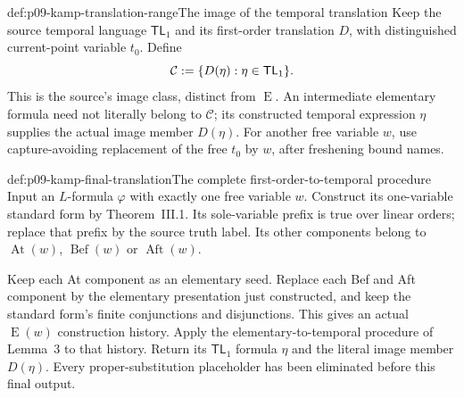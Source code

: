 \begin{hbdefinition}{def:p09-kamp-translation-range}{The image of the temporal translation}
Keep the source temporal language \(\mathsf{TL}_1\) and its
first-order translation \(D\), with distinguished current-point
variable \(t_0\). Define
\[
             \mathcal C\mathrel{:=}\{D(\eta):\eta\in\mathsf{TL}_1\}.
\]
This is the source's image class, distinct from
\(\operatorname{E}\). An intermediate elementary formula need
not literally belong to \(\mathcal C\); its constructed temporal
expression \(\eta\) supplies the actual image member \(D(\eta)\).
For another free variable \(w\), use capture-avoiding replacement
of the free \(t_0\) by \(w\), after freshening bound names.
\end{hbdefinition}

\begin{hbmethod}{def:p09-kamp-final-translation}{The complete first-order-to-temporal procedure}
Input an \(L\)-formula \(\varphi\) with exactly one free variable
\(w\). Construct its one-variable standard form by Theorem~III.1.
Its sole-variable prefix is true over linear orders; replace that
prefix by the source truth label. Its other components belong to
\(\operatorname{At}(w)\), \(\operatorname{Bef}(w)\) or
\(\operatorname{Aft}(w)\).

Keep each At component as an elementary seed. Replace each Bef and Aft
component by the elementary presentation just constructed, and keep
the standard form's finite conjunctions and disjunctions. This gives
an actual \(\operatorname{E}(w)\) construction history.
Apply the elementary-to-temporal procedure of Lemma~3 to that history.
Return its \(\mathsf{TL}_1\) formula \(\eta\) and the literal
image member \(D(\eta)\). Every proper-substitution placeholder
has been eliminated before this final output.
\end{hbmethod}

